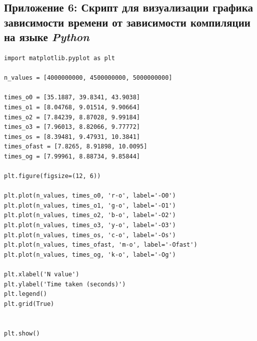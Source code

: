 \documentclass[12pt,a4paper]{article}
\numberwithin{subsection}{section}
\begin{document}
\newpage


\subsection*{Приложение 6: Скрипт для визуализации графика зависимости времени
 от зависимости компиляции на языке \textit{Python}}

\begin{lstlisting}
import matplotlib.pyplot as plt

n_values = [4000000000, 4500000000, 5000000000]

times_o0 = [35.1887, 39.8341, 43.9038]
times_o1 = [8.04768, 9.01514, 9.90664]
times_o2 = [7.84239, 8.87028, 9.99184]
times_o3 = [7.96013, 8.82066, 9.77772]
times_os = [8.39481, 9.47931, 10.3841]
times_ofast = [7.8265, 8.91898, 10.0095]
times_og = [7.99961, 8.88734, 9.85844]

plt.figure(figsize=(12, 6))

plt.plot(n_values, times_o0, 'r-o', label='-O0')
plt.plot(n_values, times_o1, 'g-o', label='-O1')
plt.plot(n_values, times_o2, 'b-o', label='-O2')
plt.plot(n_values, times_o3, 'y-o', label='-O3')
plt.plot(n_values, times_os, 'c-o', label='-Os')
plt.plot(n_values, times_ofast, 'm-o', label='-Ofast')
plt.plot(n_values, times_og, 'k-o', label='-Og')

plt.xlabel('N value')
plt.ylabel('Time taken (seconds)')
plt.legend()
plt.grid(True)


plt.show()
\end{lstlisting}
\end{document}
